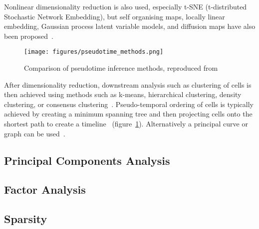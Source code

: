 Nonlinear dimensionality reduction is also used, especially t-SNE (t-distributed Stochastic Network Embedding), but self organising maps, locally linear embedding, Gaussian process latent variable models, and diffusion maps have also been proposed~\cite{Kim2015SingleCell,Welch2016SLICER,Haghverdi2015Diffusion,Campbell2015Bayesian}.

\begin{figure}[H]
	\centering
	\texttt{[image: figures/pseudotime\_methods.png]}
	\caption{Comparison of pseudotime inference methods, reproduced from~\cite{Cannoodt2016Computational}}
	\label{fig:pseudotime_methods}
\end{figure}

After dimensionality reduction, downstream analysis such as clustering of cells is then achieved using methods such as k-means, hierarchical clustering, density clustering, or consensus clustering~\cite{Zurauskiene2016PcaReduce,Kiselev2017SC3,Guo2015SINCERA,Satija2015Spatial}. Pseudo-temporal ordering of cells is typically achieved by creating a minimum spanning tree and then projecting cells onto the shortest path to create a timeline~\cite{Trapnell2014Dynamics,Ji2016TSCAN} (figure~\ref{fig:pseudotime_methods}). Alternatively a principal curve or graph can be used~\cite{Marco2014Bifurcation,Qiu2017Reversed}.




\subsection{Principal Components Analysis}

\subsection{Factor Analysis}

\subsection{Sparsity}

